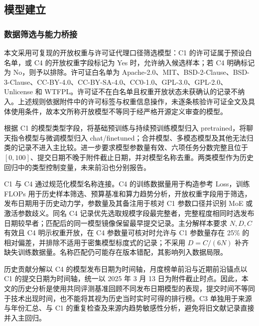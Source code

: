 \documentclass[bwprint]{gmcmthesis}
\numberwithin{equation}{section}
\numberwithin{figure}{section}
\numberwithin{table}{section}
\begin{document}
    \subsection{模型建立}

        \subsubsection{数据筛选与能力桥接}
        本文采用可复现的开放权重与许可证代理口径筛选模型：C1 的许可证属于预设白名单，或 C4 的开放权重字段标记为 Yes 时，允许纳入候选样本；若 C4 明确标记为 No，则予以排除。许可证白名单为 Apache-2.0、MIT、BSD-2-Clause、BSD-3-Clause、CC-BY-4.0、CC-BY-SA-4.0、CC0-1.0、GPL-3.0、GPL-2.0、Unlicense 和 WTFPL。许可证不在白名单且权重开放状态未获确认的记录不纳入。上述规则依据附件中的许可标签与权重信息操作，未逐条核验许可证全文及具体使用条件，故本文所称开放模型不等同于经严格开源定义审查的模型。

        根据 C1 的模型类型字段，将基础预训练与持续预训练模型归入 pretrained，将聊天指令模型与微调模型归入 chat/finetuned；合并模型、多模态模型及其他无法归类的记录不进入主比较。进一步要求模型参数量有效、六项任务分数完整且位于 $[0,100]$、提交日期不晚于附件截止日期，并对模型名称去重。两类模型作为历史回归中的类型控制变量，未来前沿也分别报告。

        C1 与 C4 通过规范化模型名称连接。C4 的训练数据量用于构造参考 Loss，训练 FLOPs 用于历史样本筛选、预算基准和算力趋势分析，开放权重字段用于筛选，发布日期用于历史动力学，参数量及其备注用于核对 C1 参数口径并识别 MoE 或激活参数歧义。同名 C4 记录优先选取规模字段最完整者，完整程度相同时选发布日期较早者；匹配后的同一模型镜像保留最早提交记录。主分解样本要求 $N,D,C$ 有效且 C4 明示权重开放，在 C4 参数量可核对时允许与 C1 参数量存在 25\% 的相对偏差，并排除不适用于密集模型标度式的记录；不采用 $D=C/(6N)$ 补齐缺失训练数据量。名称匹配仍可能存在版本错配，其影响列入数据局限。

        历史贡献分解以 C4 的模型发布日期为时间轴，月度榜单前沿与近期前沿锚点以 C1 的提交日期为时间轴，统一以 2025 年 3 月 13 日为附件截止时点。因此，本文的历史分析是使用共同评测基准回顾不同发布日期模型的表现，提交时间不等同于技术出现时间，也不能将其视为历史当时实时可得的排行榜。C3 单独用于来源与年份汇总、与 C1 的重复检查及来源内趋势敏感性分析，避免将旧文献记录直接并入主回归。
\end{document}
